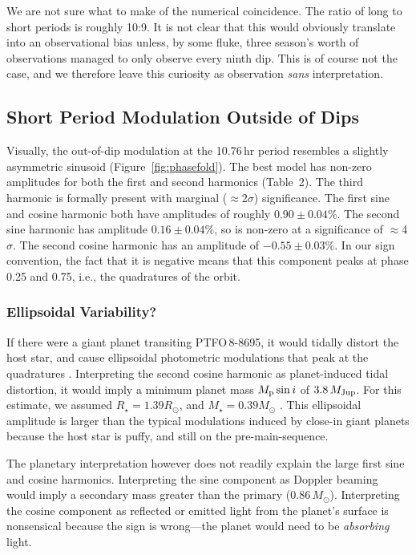 \documentclass[12pt,twocolumn,tighten,trackchanges]{aastex62}
\newcommand{\ptfo}{PTFO$\,$8-8695}
\begin{document}
We are not sure what to make of the numerical coincidence.  The ratio
of long to short periods is roughly 10:9.  It is not clear that this
would obviously translate into an observational bias unless, by some
fluke, three season's worth of observations managed to only observe
every ninth dip.  This is of course not the case, and we therefore
leave this curiosity as observation {\it sans} interpretation.


\subsection{Short Period Modulation Outside of Dips}
Visually, the out-of-dip modulation at the 10.76$\,$hr period
resembles a slightly asymmetric sinusoid (Figure~\ref{fig:phasefold}).
The best model has non-zero amplitudes for both the first and second
harmonics (Table~2).  The third harmonic is formally present with
marginal ($\approx$2$\sigma$) significance.  The first sine and cosine
harmonic both have amplitudes of roughly $0.90\pm0.04\%$.  The second
sine harmonic has amplitude $0.16 \pm 0.04\%$, so is non-zero at a
significance of $\approx$4$\sigma$.  The second cosine harmonic has an
amplitude of $-0.55 \pm 0.03\%$.  In our sign convention, the fact
that it is negative means that this component peaks at phase 0.25 and
0.75, i.e., the quadratures of the orbit.

\subsubsection{Ellipsoidal Variability?}
If there were a giant planet transiting \ptfo, it would tidally
distort the host star, and cause ellipsoidal photometric modulations
that peak at the quadratures \citep[see][]{shporer_astrophysics_2017}.
Interpreting the second cosine harmonic as planet-induced tidal
distortion, it would imply a minimum planet mass $M_{\rm p} \sin i$ of
$3.8\,M_{\rm Jup}$.  For this estimate, we assumed $R_\star = 1.39
R_\odot$, and $M_\star = 0.39 M_\odot$ \citep{van_eyken_ptf_2012}.
This ellipsoidal amplitude is larger than the typical modulations
induced by close-in giant planets because the host star is puffy, and
still on the pre-main-sequence.

The planetary interpretation however does not readily explain the
large first sine and cosine harmonics.  Interpreting the sine
component as Doppler beaming would imply a secondary mass greater than
the primary ($0.86\,M_\odot$).  Interpreting the cosine component as
reflected or emitted light from the planet's surface is nonsensical
because the sign is wrong---the planet would need to be {\it
absorbing} light.
\end{document}
